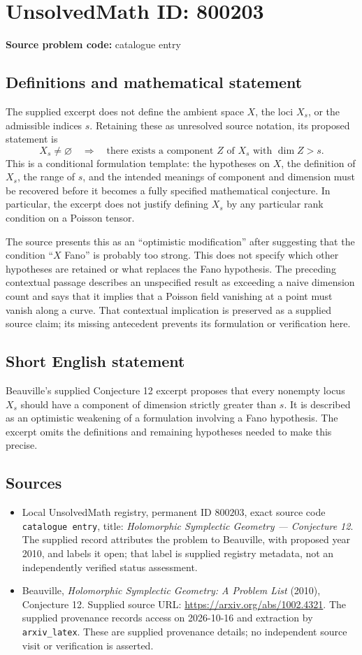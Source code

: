 \documentclass[11pt]{article}
\begin{document}
\section*{UnsolvedMath ID: 800203}
\textbf{Source problem code:} catalogue entry
\subsection{Definitions and mathematical statement}
The supplied excerpt does not define the ambient space \(X\), the loci \(X_s\), or the admissible indices \(s\). Retaining these as unresolved source notation, its proposed statement is
\[
X_s\neq\varnothing
\quad\Longrightarrow\quad
\text{there exists a component }Z\text{ of }X_s\text{ with }\dim Z>s.
\]
This is a conditional formulation template: the hypotheses on \(X\), the definition of \(X_s\), the range of \(s\), and the intended meanings of component and dimension must be recovered before it becomes a fully specified mathematical conjecture. In particular, the excerpt does not justify defining \(X_s\) by any particular rank condition on a Poisson tensor.

The source presents this as an ``optimistic modification'' after suggesting that the condition ``\(X\) Fano'' is probably too strong. This does not specify which other hypotheses are retained or what replaces the Fano hypothesis. The preceding contextual passage describes an unspecified result as exceeding a naive dimension count and says that it implies that a Poisson field vanishing at a point must vanish along a curve. That contextual implication is preserved as a supplied source claim; its missing antecedent prevents its formulation or verification here.
\subsection{Short English statement}
Beauville's supplied Conjecture 12 excerpt proposes that every nonempty locus \(X_s\) should have a component of dimension strictly greater than \(s\). It is described as an optimistic weakening of a formulation involving a Fano hypothesis. The excerpt omits the definitions and remaining hypotheses needed to make this precise.
\subsection{Sources}
\begin{itemize}
\item Local UnsolvedMath registry, permanent ID \(800203\), exact source code \texttt{catalogue entry}, title: \emph{Holomorphic Symplectic Geometry --- Conjecture 12}. The supplied record attributes the problem to Beauville, with proposed year 2010, and labels it open; that label is supplied registry metadata, not an independently verified status assessment.
\item Beauville, \emph{Holomorphic Symplectic Geometry: A Problem List} (2010), Conjecture 12. Supplied source URL: \url{https://arxiv.org/abs/1002.4321}. The supplied provenance records access on 2026-10-16 and extraction by \texttt{arxiv\_latex}. These are supplied provenance details; no independent source visit or verification is asserted.
\end{itemize}
\end{document}

